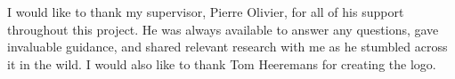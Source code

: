 I would like to thank my supervisor, Pierre Olivier, for all of his support
throughout this project. He was always available to answer any questions, gave
invaluable guidance, and shared relevant research with me as he stumbled across
it in the wild. I would also like to thank Tom Heeremans  for creating the \af logo.

\clearpage

\tableofcontents

\clearpage

\printacronyms[name=Acronyms and Abbreviations]

\clearpage

\listoffigures


\clearpage

\listoftables

\clearpage

\listoflistings{}
